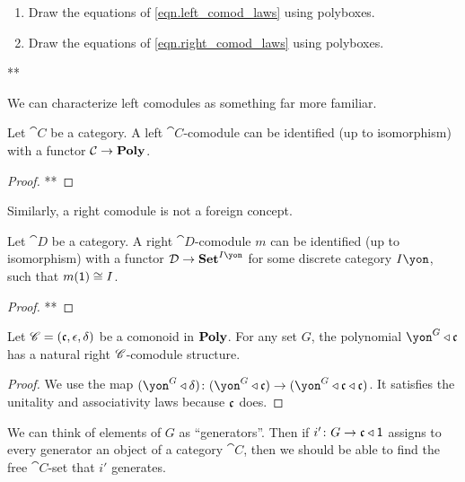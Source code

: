 \documentclass[Book-Poly]{subfiles}
\begin{document}
\begin{exercise}
\begin{enumerate}
	\item Draw the equations of \eqref{eqn.left_comod_laws} using polyboxes.
	\item Draw the equations of \eqref{eqn.right_comod_laws} using polyboxes.
\qedhere
\end{enumerate}
\begin{solution}
**
\end{solution}
\end{exercise}

We can characterize left comodules as something far more familiar.

\begin{proposition}
Let $\cat{C}$ be a category.
A left $\cat{C}$-comodule can be identified (up to isomorphism) with a functor $\mathcal{C}\to\mathbf{Poly}$.
\end{proposition}
\begin{proof}
**
\end{proof}

Similarly, a right comodule is not a foreign concept.

\begin{proposition}
Let $\cat{D}$ be a category.
A right $\cat{D}$-comodule $m$ can be identified (up to isomorphism) with a functor $\cat{D}\to\smset^{I\yon}$ for some discrete category $I\yon$, such that $m(\textsf{1})\cong I$.
\end{proposition}
\begin{proof}
**
\end{proof}


\begin{proposition}\label{prop.all_free_modules}
Let $\mathscr{C}=(\mathfrak{c},\epsilon,\delta)$ be a comonoid in $\mathbf{Poly}$. For any set $G$, the polynomial $\yon^G\tri\car{c}$ has a natural right $\mathscr{C}$-comodule structure.
\end{proposition}
\begin{proof}
We use the map $(\yon^G\tri\delta)\colon(\yon^G\tri\car{c})\to(\yon^G\tri\car{c}\tri\car{c})$. It satisfies the unitality and associativity laws because $\mathfrak{c}$ does.
\end{proof}

We can think of elements of $G$ as ``generators''. Then if $i'\colon G\to\mathfrak{c}\mathbin{\triangleleft}\textsf{1}$ assigns to every generator an object of a category $\cat{C}$, then we should be able to find the free $\cat{C}$-set that $i'$ generates.
\end{document}
